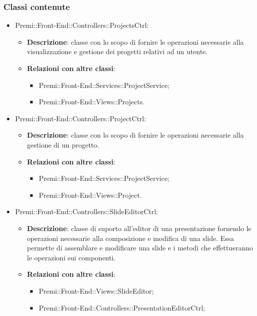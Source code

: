 \subsubsection*{Classi contenute}
\begin{itemize}

	\item Premi::Front-End::Controllers::ProjectsCtrl:
	\begin{itemize}
		\item \textbf{Descrizione}: classe con lo scopo di fornire le operazioni necessarie alla visualizzazione e gestione dei progetti relativi ad un utente.
		\item \textbf{Relazioni con altre classi}:
		\begin{itemize}
			\item Premi::Front-End::Services::ProjectService;
			\item Premi::Front-End::Views::Projects.
		\end{itemize}
	\end{itemize}
	\item  Premi::Front-End::Controllers::ProjectCtrl:
	\begin{itemize}
		\item \textbf{Descrizione}: classe con lo scopo di fornire le operazioni necessarie alla gestione di un progetto.
		\item \textbf{Relazioni con altre classi}:
		\begin{itemize}
			\item Premi::Front-End::Services::ProjectService;
			\item Premi::Front-End::Views::Project.
		\end{itemize}
	\end{itemize}
	\item  Premi::Front-End::Controllers::SlideEditorCtrl:
	\begin{itemize}
		\item \textbf{Descrizione}: classe di suporto all'editor di una presentazione fornendo le operazioni necessarie alla composizione e modifica di una slide. Essa permette di assemblare e modificare una \gls{slide} e i metodi che effettueranno le operazioni sui componenti.
		\item \textbf{Relazioni con altre classi}:
		\begin{itemize}
			\item Premi::Front-End::Views::SlideEditor;
			\item Premi::Front-End::Controllers::PresentationEditorCtrl;

\end{itemize}
\end{itemize}
\end{itemize}
